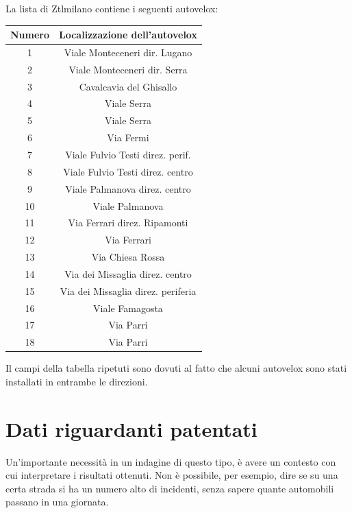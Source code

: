 \documentclass[a4paper,12pt]{report}
\begin{document}
La lista di Ztlmilano contiene i seguenti autovelox: 

\begin{center}
    \def\arraystretch{1.5}%
    \begin{tabular}{ |c|c| } 
    \hline
    Numero & Localizzazione dell'autovelox \\ 
    \hline
    \rowcolor{TableGray}
    1   &   Viale Monteceneri  dir. Lugano\\
    2   &   Viale Monteceneri dir. Serra\\
    \rowcolor{TableGray}
    3   &   Cavalcavia del Ghisallo\\
    4   &   Viale Serra \\
    \rowcolor{TableGray}
    5   &   Viale Serra\\
    6   &   Via Fermi\\
    \rowcolor{TableGray}
    7   &   Viale Fulvio Testi direz. perif.\\
    8   &   Viale Fulvio Testi direz. centro\\
    \rowcolor{TableGray}
    9   &   Viale Palmanova  direz. centro\\
    10  &   Viale Palmanova\\
    \rowcolor{TableGray}
    11  &   Via Ferrari direz. Ripamonti\\
    12  &   Via Ferrari\\
    \rowcolor{TableGray}
    13  &   Via Chiesa Rossa\\
    14  &   Via dei Missaglia direz. centro\\
    \rowcolor{TableGray}
    15  &   Via dei Missaglia direz. periferia\\
    16  &   Viale Famagosta\\
    \rowcolor{TableGray}
    17  &   Via Parri\\
    18  &   Via Parri\\
    \hline
    \end{tabular}
    \label{ztl-milano}
\end{center}

Il campi della tabella ripetuti sono dovuti al fatto che alcuni autovelox sono stati 
installati in entrambe le direzioni.

\section{Dati riguardanti patentati}

Un'importante necessità in un indagine di questo tipo, è avere un contesto con cui 
interpretare i risultati ottenuti. 
Non è possibile, per esempio, dire se su una certa strada si ha un numero alto di 
incidenti, senza sapere quante automobili passano in una giornata.
\end{document}
